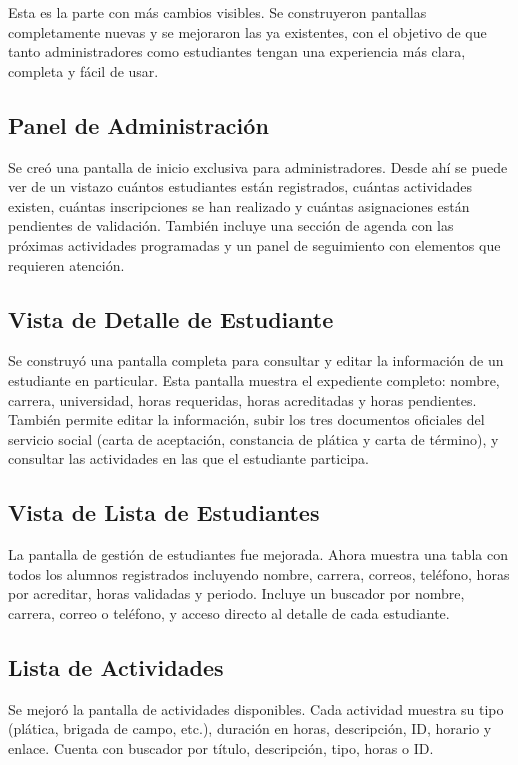 \documentclass[12pt, a4paper]{article}
\begin{document}
Esta es la parte con más cambios visibles. Se construyeron pantallas completamente nuevas y se mejoraron las ya existentes, con el objetivo de que tanto administradores como estudiantes tengan una experiencia más clara, completa y fácil de usar.

\subsection{Panel de Administración}

Se creó una pantalla de inicio exclusiva para administradores. Desde ahí se puede ver de un vistazo cuántos estudiantes están registrados, cuántas actividades existen, cuántas inscripciones se han realizado y cuántas asignaciones están pendientes de validación. También incluye una sección de agenda con las próximas actividades programadas y un panel de seguimiento con elementos que requieren atención.

\subsection{Vista de Detalle de Estudiante}

Se construyó una pantalla completa para consultar y editar la información de un estudiante en particular. Esta pantalla muestra el expediente completo: nombre, carrera, universidad, horas requeridas, horas acreditadas y horas pendientes. También permite editar la información, subir los tres documentos oficiales del servicio social (carta de aceptación, constancia de plática y carta de término), y consultar las actividades en las que el estudiante participa.

\subsection{Vista de Lista de Estudiantes}

La pantalla de gestión de estudiantes fue mejorada. Ahora muestra una tabla con todos los alumnos registrados incluyendo nombre, carrera, correos, teléfono, horas por acreditar, horas validadas y periodo. Incluye un buscador por nombre, carrera, correo o teléfono, y acceso directo al detalle de cada estudiante.

\subsection{Lista de Actividades}

Se mejoró la pantalla de actividades disponibles. Cada actividad muestra su tipo (plática, brigada de campo, etc.), duración en horas, descripción, ID, horario y enlace. Cuenta con buscador por título, descripción, tipo, horas o ID.
\end{document}
